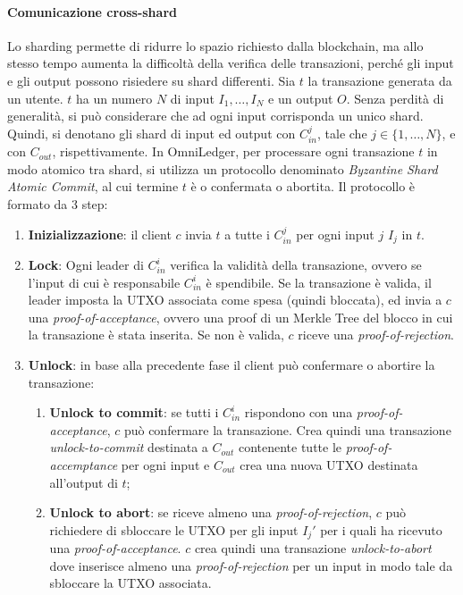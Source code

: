 \paragraph*{Comunicazione cross-shard}
Lo sharding permette di ridurre lo spazio richiesto dalla blockchain, ma allo stesso tempo aumenta la difficoltà della verifica delle transazioni, perché gli input e gli output possono risiedere su shard differenti. Sia $t$ la transazione generata da un utente. $t$ ha un numero $N$ di input $I_1, \dots, I_N$ e un output $O$. Senza perdità di generalità, si può considerare che ad ogni input corrisponda un unico shard. Quindi, si denotano gli shard di input ed output con $C_{in}^j$, tale che $j \in \{1, \dots, N\}$, e con $C_{out}$, rispettivamente. 
In OmniLedger, per processare ogni transazione $t$ in modo atomico tra shard, si utilizza un protocollo denominato \emph{Byzantine Shard Atomic Commit}, al cui termine $t$ è o confermata o abortita. Il protocollo è formato da 3 step:

\begin{enumerate}
	\item \textbf{Inizializzazione}: il client $c$ invia $t$ a tutte i $C_{in}^j$ per ogni input $j$ $I_j$ in $t$.
	\item \textbf{Lock}: Ogni leader di $C_{in}^i$ verifica la validità della transazione, ovvero se l'input di cui è responsabile $C_{in}^i$ è spendibile. Se la transazione è valida, il leader imposta la UTXO associata come spesa (quindi bloccata), ed invia a $c$ una \emph{proof-of-acceptance}, ovvero una proof di un Merkle Tree del blocco in cui la transazione è stata inserita. Se non è valida, $c$ riceve una \emph{proof-of-rejection}.
	\item \textbf{Unlock}: in base alla precedente fase il client può confermare o abortire la transazione:
	
	\begin{enumerate}
		\item \textbf{Unlock to commit}: se tutti i $C_{in}^i$ rispondono con una \emph{proof-of-acceptance}, $c$ può confermare la transazione. Crea quindi una transazione \emph{unlock-to-commit} destinata a $C_{out}$ contenente tutte le \emph{proof-of-accemptance} per ogni input e $C_{out}$ crea una nuova UTXO destinata all'output di $t$;
		\item \textbf{Unlock to abort}: se riceve almeno una \emph{proof-of-rejection}, $c$ può richiedere di sbloccare le UTXO per gli input $I_j'$ per i quali ha ricevuto una \emph{proof-of-acceptance}. $c$ crea quindi una transazione \emph{unlock-to-abort} dove inserisce almeno una \emph{proof-of-rejection} per un input in modo tale da sbloccare la UTXO associata.
	\end{enumerate}

\end{enumerate}


